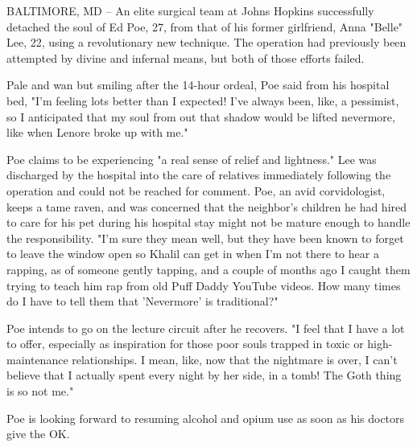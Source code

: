 BALTIMORE, MD -- An elite surgical team at Johns Hopkins successfully
detached the soul of Ed Poe, 27, from that of his former girlfriend,
Anna "Belle" Lee, 22, using a revolutionary new technique. The operation
had previously been attempted by divine and infernal means, but both of
those efforts failed.

Pale and wan but smiling after the 14-hour ordeal, Poe said from his
hospital bed, "I'm feeling lots better than I expected! I've always
been, like, a pessimist, so I anticipated that my soul from out that
shadow would be lifted nevermore, like when Lenore broke up with me."

Poe claims to be experiencing "a real sense of relief and lightness."
Lee was discharged by the hospital into the care of relatives
immediately following the operation and could not be reached for
comment. Poe, an avid corvidologist, keeps a tame raven, and was
concerned that the neighbor's children he had hired to care for his pet
during his hospital stay might not be mature enough to handle the
responsibility. "I'm sure they mean well, but they have been known to
forget to leave the window open so Khalil can get in when I'm not there
to hear a rapping, as of someone gently tapping, and a couple of months
ago I caught them trying to teach him rap from old Puff Daddy YouTube
videos. How many times do I have to tell them that 'Nevermore' is
traditional?"

Poe intends to go on the lecture circuit after he recovers. "I feel that
I have a lot to offer, especially as inspiration for those poor souls
trapped in toxic or high-maintenance relationships. I mean, like, now
that the nightmare is over, I can't believe that I actually spent every
night by her side, in a tomb! The Goth thing is so not me."

Poe is looking forward to resuming alcohol and opium use as soon as his
doctors give the OK.
